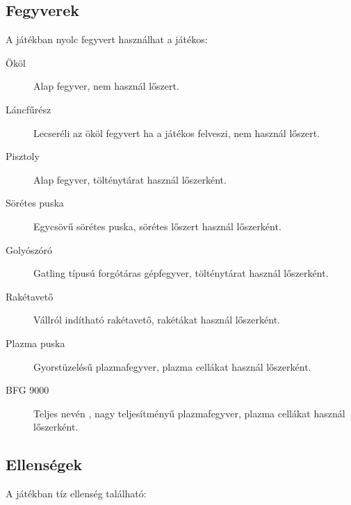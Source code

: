 \documentclass{thesis-ekf}
\theoremstyle{definition}
\begin{document}
\subsection{Fegyverek}

A játékban nyolc fegyvert használhat a játékos:

\begin{description}
    \item[Ököl] Alap fegyver, nem használ lőszert.
    \item[Láncfűrész] Lecseréli az ököl fegyvert ha a játékos felveszi, nem
        használ lőszert.
    \item[Pisztoly] Alap fegyver, tölténytárat használ lőszerként.
    \item[Sörétes puska] Egycsövű sörétes puska, sörétes lőszert használ
        lőszerként.
    \item[Golyószóró] Gatling típusú forgótáras gépfegyver, tölténytárat használ
        lőszerként.
    \item[Rakétavető] Vállról indítható rakétavető, rakétákat használ
        lőszerként.
    \item[Plazma puska] Gyorstüzelésű plazmafegyver, plazma cellákat használ
        lőszerként.
    \item[BFG 9000] Teljes nevén , nagy
        teljesítményű plazmafegyver, plazma cellákat használ lőszerként.
\end{description}
\cite[Fegyverek]{doomgame}

\subsection{Ellenségek}

A játékban tíz ellenség található:
\end{document}
